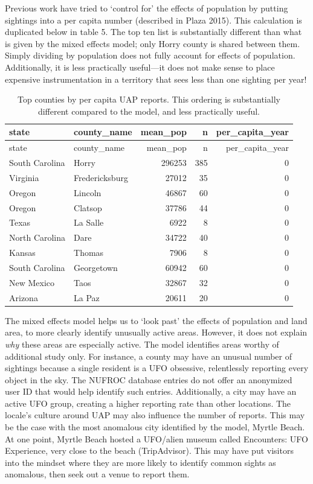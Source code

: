 \documentclass[]{elsarticle} %
\begin{document}
Previous work have tried to `control for' the effects of population by
putting sightings into a per capita number (described in Plaza 2015).
This calculation is duplicated below in table 5. The top ten list is
substantially different than what is given by the mixed effects model;
only Horry county is shared between them. Simply dividing by population
does not fully account for effects of population. Additionally, it is
less practically useful---it does not make sense to place expensive
instrumentation in a territory that sees less than one sighting per
year!

\begin{longtable}[]{@{}llrrr@{}}
\caption{Top counties by per capita UAP reports. This ordering is
substantially different compared to the model, and less practically
useful.}\tabularnewline
\toprule
state & county\_name & mean\_pop & n & per\_capita\_year \\
\midrule
\endfirsthead
\toprule
state & county\_name & mean\_pop & n & per\_capita\_year \\
\midrule
\endhead
South Carolina & Horry & 296253 & 385 & 0 \\
Virginia & Fredericksburg & 27012 & 35 & 0 \\
Oregon & Lincoln & 46867 & 60 & 0 \\
Oregon & Clatsop & 37786 & 44 & 0 \\
Texas & La Salle & 6922 & 8 & 0 \\
North Carolina & Dare & 34722 & 40 & 0 \\
Kansas & Thomas & 7906 & 8 & 0 \\
South Carolina & Georgetown & 60942 & 60 & 0 \\
New Mexico & Taos & 32867 & 32 & 0 \\
Arizona & La Paz & 20611 & 20 & 0 \\
\bottomrule
\end{longtable}

The mixed effects model helps us to `look past' the effects of
population and land area, to more clearly identify unusually active
areas. However, it does not explain \emph{why} these areas are
especially active. The model identifies areas worthy of additional study
only. For instance, a county may have an unusual number of sightings
because a single resident is a UFO obsessive, relentlessly reporting
every object in the sky. The NUFROC database entries do not offer an
anonymized user ID that would help identify such entries. Additionally,
a city may have an active UFO group, creating a higher reporting rate
than other locations. The locale's culture around UAP may also influence
the number of reports. This may be the case with the most anomalous city
identified by the model, Myrtle Beach. At one point, Myrtle Beach hosted
a UFO/alien museum called Encounters: UFO Experience, very close to the
beach (TripAdvisor). This may have put visitors into the mindset where
they are more likely to identify common sights as anomalous, then seek
out a venue to report them.
\end{document}
